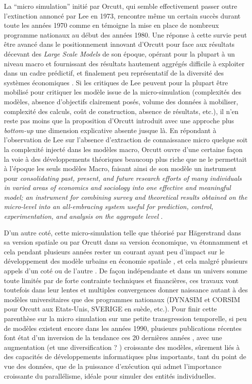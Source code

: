 La \enquote{micro simulation} initié par Orcutt, qui semble effectivement passer outre l'extinction annoncé par Lee en 1973, rencontre même un certain succès durant toute les années 1970 comme en témoigne la mise en place de nombreux programme nationaux au début des années 1980. \autocite{Baroni2007} Une réponse à cette survie peut être avancé dans le positionnement innovant d'Orcutt pour face aux résultats décevant des \textit{Large Scale Models} de son époque, opérant pour la plupart à un niveau macro et fournissant des résultats hautement aggrégés difficile à exploiter dans un cadre prédictif, et finalement peu représentatif de la diversité des systèmes économiques \autocite{Birkin2012} \autocite{Baroni2007}. Si les critiques de Lee peuvent pour la plupart être mobilisé pour critiquer les modèle issue de la micro-simulation (complexités des modèles, absence d'objectifs clairement posés, volume des données à mobiliser, complexité des calculs, coût de construction, absence de résultats, etc.), il n'en reste pas moins que la proposition d'Orcutt introduit avec une approche plus \textit{bottom-up} une dimension explicative absente jusque là. En répondant à l'observation de Lee sur l'absence d'extraction de connaissance micro quelque soit la complexité injecté dans les modèles macro, Orcutt ouvre d'une certaine façon la voie à des développements théoriques beaucoup plus riche que ne le permettait à l'époque les seuls modèles Macro, faisant ainsi de son modèle un instrument pour \textit{consolidating past, present, and future research efforts of many individuals in varied areas of economics and sociology into one effective and meaningful model; an instrument for combining survey and theoretical results obtained on the micro-level into an all-embracing system useful for prediction, control, experimentation, and analysis on the aggregate level} \autocite[122]{Cohen1961}.

D'un autre coté, cette micro-simulation telle que théorisé par Hägerstrand dans sa version spatiale ou par Orcutt dans sa version économique, va étonnamment et cela pendant plusieurs années rester un courant ayant peu d'impact sur le développement des modèle urbains en économie spatiale \autocite[5]{Sanders2006}, et cela malgré plusieurs appels d'un coté \autocite{Hagerstrand1970} ou de l'autre \autocite[5]{Isard1998}. De façon indépendante et dans un univers somme toute limités par de forte contrainte techniques et financières, ces travaux vont toutefois dans leur lentes et multiples convergences donner naissance autant à des modèles universitaires que des programmes nationaux (DYNASIM et CORSIM pour Orcutt aux Etats-Unis, SVERIGE en suède, etc.). Pour finir cette parenthèse sur la micro simulation sur une petite transgression temporelle, si peu de modèles existent encore dans les années 1990, plusieurs publications récentes font état d'un inversion de la tendance ces 20 dernières années \autocite{Lenormand2013}, avec une augmentation (et une diversification ? ) croissante des modèles, sûrement liés à des capacités de développements informatiques plus importants, tant du point de vue des données, que de la puissance d’exécution qui admet l'importance croissante du parallélisme, idéale pour simuler des entités individuelles. \autocite[5]{Sanders2006} \autocite{Lenormand2013}

